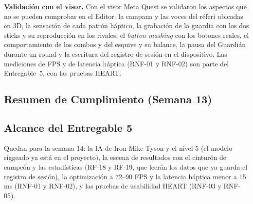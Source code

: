 \textbf{Validación con el visor.} Con el visor Meta Quest se validaron los aspectos que no se pueden comprobar en el Editor: la campana y las voces del réferi ubicadas en 3D, la sensación de cada patrón háptico, la grabación de la guardia con los dos sticks y su reproducción en los rivales, el \emph{button mashing} con los botones reales, el comportamiento de los combos y del esquive y su balance, la pausa del Guardián durante un round y la escritura del registro de sesión en el dispositivo. Las mediciones de FPS y de latencia háptica (RNF-01 y RNF-02) son parte del Entregable~5, con las pruebas HEART.

\subsection{Resumen de Cumplimiento (Semana 13)}
\begin{table}[H]
\centering
\caption{Cumplimiento del Entregable 4.}
\end{table}

\subsection{Alcance del Entregable 5}
Quedan para la semana 14: la IA de Iron Mike Tyson y el nivel 5 (el modelo riggeado ya está en el proyecto), la escena de resultados con el cinturón de campeón y las estadísticas (RF-18 y RF-19, que leerán los datos que ya guarda el registro de sesión), la optimización a 72--90 FPS y la latencia háptica menor a 15 ms (RNF-01 y RNF-02), y las pruebas de usabilidad HEART (RNF-03 y RNF-05).
